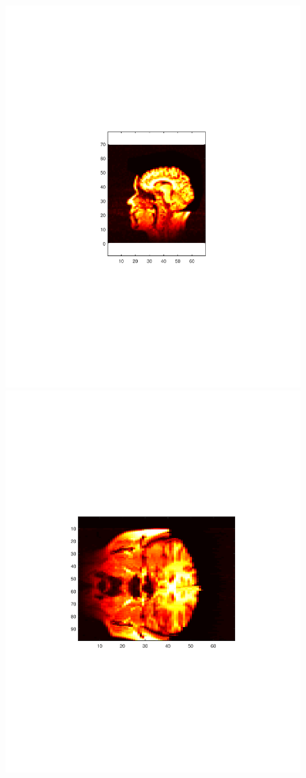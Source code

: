 \documentclass{UCF_ETD}
\begin{document}
\begin{figure}[H] 
\begin{center}
\includegraphics[scale=0.52]{RobustRegistration/MRIImageXY}
\includegraphics[scale=0.5]{RobustRegistration/MRIImageYZ}

\end{center}
\end{figure}
\end{document}
